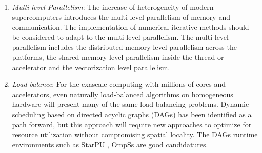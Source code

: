 {\begin{enumerate}[label=(\arabic*)]
    In 2013, an analysis of energy-optimized lattice-Boltzmann CFD simulations from the chip to the highly parallel level was introduced by Wittmann et al. \cite{wittmann2013analysis}. Padoin et al. \cite{padoin2013evaluating} evaluated the application performance and energy consumption on hybrid CPU/GPU architecture. In 2015, Anzt et al. \cite{anzt2015energy} unveil some energy efficiency and performance frontiers for sparse computations on GPU-based supercomputers. Aliaga et al. \cite{aliaga2015unveiling} unveil the performance-energy trade-off in iterative linear system solvers for multithreaded processors. In order to gain insights about the benefits of hands-on optimizations, they analyze the runtime and energy efficiency results for both out-of-the-box usage relying exclusively on compiler optimizations, and implementations manually optimized for target architectures, that range from CPUs and DSPs to manycore GPUs.
	
	\item \textit{Multi-level Parallelism}: The increase of heterogeneity of modern supercomputers introduces the multi-level parallelism of memory and communication. The implementation of numerical iterative methods should be considered to adapt to the multi-level parallelism. The multi-level parallelism includes the distributed memory level parallelism across the platforms, the shared memory level parallelism inside the thread or accelerator and the vectorization level parallelism.
	
	\item \textit{Load balance}: For the exascale computing with millions of cores and accelerators, even naturally load-balanced algorithms on homogeneous hardware will present many of the same load-balancing problems. Dynamic scheduling based on directed acyclic graphs (DAGs) has been identified as a path forward, but this approach will require new approaches to optimize for resource utilization without compromising spatial locality. The DAGs runtime environments such as StarPU \cite{augonnet2011starpu}, OmpSs \cite{duran2011ompss} are good candidatures.
		

\end{enumerate}}
